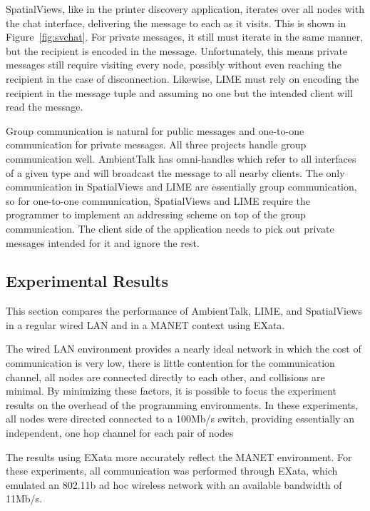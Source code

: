 SpatialViews, like in the printer discovery application, iterates over all nodes with the chat interface, delivering the message to each as it visits. This is shown in Figure~\ref{fig:svchat}. For private messages, it still must iterate in the same manner, but the recipient is encoded in the message. Unfortunately, this means private messages still require visiting every node, possibly without even reaching the recipient in the case of disconnection. Likewise, LIME must rely on encoding the recipient in the message tuple and assuming no one but the intended client will read the message.

Group communication is natural for public messages and one-to-one communication for private messages. All three projects handle group communication well. AmbientTalk has omni-handles which refer to all interfaces of a given type and will broadcast the message to all nearby clients. The only communication in SpatialViews and LIME are essentially group communication, so for one-to-one communication, SpatialViews and LIME require the programmer to implement an addressing scheme on top of the group communication. The client side of the application needs to pick out private messages intended for it and ignore the rest.

\subsection{Experimental Results}

This section compares the performance of AmbientTalk, LIME, and SpatialViews in a regular wired LAN and in a MANET context using EXata.

The wired LAN environment provides a nearly ideal network in which the cost of communication is very low, there is little contention for the communication channel, all nodes are connected directly to each other, and collisions are minimal. By minimizing these factors, it is possible to focus the experiment results on the overhead of the programming environments. In these experiments, all nodes were directed connected to a 100Mb/s switch, providing essentially an independent, one hop channel for each pair of nodes

The results using EXata more accurately reflect the MANET environment. For these experiments, all communication was performed through EXata, which emulated an 802.11b ad hoc wireless network with an available bandwidth of 11Mb/s.

